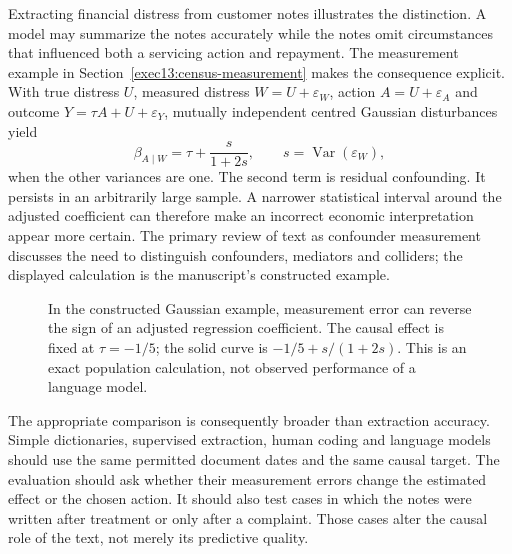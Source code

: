 Extracting financial distress from customer notes illustrates the distinction.
A model may summarize the notes accurately while the notes omit circumstances
that influenced both a servicing action and repayment. The measurement example
in Section~\ref{exec13:census-measurement} makes the consequence explicit.
With true distress $U$, measured distress $W=U+\varepsilon_W$, action
$A=U+\varepsilon_A$ and outcome $Y=\tau A+U+\varepsilon_Y$, mutually
independent centred Gaussian disturbances yield
\[
 \beta_{A\mid W}=\tau+\frac{s}{1+2s},\qquad
 s=\operatorname{Var}(\varepsilon_W),
\]
when the other variances are one. The second term is residual confounding.
It persists in an arbitrarily large sample. A narrower statistical interval
around the adjusted coefficient can therefore make an incorrect economic
interpretation appear more certain. The primary review of text as confounder
measurement discusses the need to distinguish confounders, mediators and
colliders; the displayed calculation is the manuscript's constructed example.
\citep{exec13_census_text_review_arxiv}

\begin{figure}[htbp]\centering
{}
\caption{In the constructed Gaussian example, measurement error can reverse
the sign of an adjusted regression coefficient. The causal effect is fixed at
$\tau=-1/5$; the solid curve is $-1/5+s/(1+2s)$. This is an exact population
calculation, not observed performance of a language model.}
\label{reading:measurement-error}
\end{figure}

The appropriate comparison is consequently broader than extraction accuracy.
Simple dictionaries, supervised extraction, human coding and language models
should use the same permitted document dates and the same causal target.
The evaluation should ask whether their measurement errors change the estimated
effect or the chosen action. It should also test cases in which the notes were
written after treatment or only after a complaint. Those cases alter the
causal role of the text, not merely its predictive quality.
\citep{exec13_census_text_review_arxiv}

